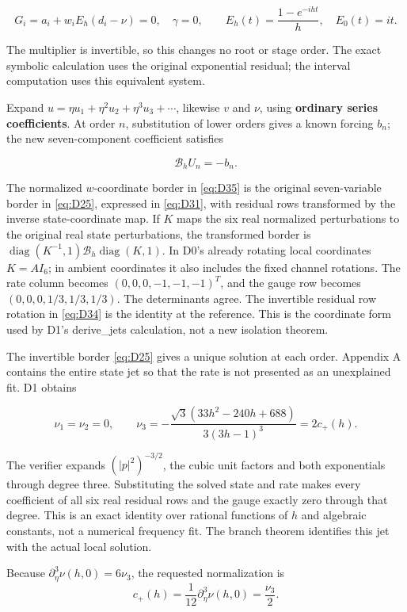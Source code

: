 \documentclass[11pt,a4paper]{article}
\begin{document}
\[
G_i=a_i+w_iE_h(d_i-\nu)=0,\quad \gamma=0,\qquad
E_h(t)=\frac{1-e^{-iht}}h,\quad E_0(t)=it.
\tag{D34}\label{eq:D34}
\]

The multiplier is invertible, so this changes no root or stage order. The exact symbolic calculation uses the original exponential residual; the interval computation uses this equivalent system.

Expand \(u=\eta u_1+\eta^2u_2+\eta^3u_3+\cdots\), likewise \(v\) and \(\nu\), using \textbf{ordinary series coefficients}. At order \(n\), substitution of lower orders gives a known forcing \(b_n\); the new seven-component coefficient satisfies

\[
\mathcal B_h U_n=-b_n.
\tag{D35}\label{eq:D35}
\]

The normalized \(w\)-coordinate border in \eqref{eq:D35} is the original seven-variable border in \eqref{eq:D25}, expressed in \eqref{eq:D31}, with residual rows transformed by the inverse state-coordinate map. If \(K\) maps the six real normalized perturbations to the original real state perturbations, the transformed border is \(\operatorname{diag}(K^{-1},1)\mathcal B_h\operatorname{diag}(K,1)\). In D0's already rotating local coordinates \(K=A I_6\); in ambient coordinates it also includes the fixed channel rotations. The rate column becomes \((0,0,0,-1,-1,-1)^T\), and the gauge row becomes \((0,0,0,1/3,1/3,1/3)\). The determinants agree. The invertible residual row rotation in \eqref{eq:D34} is the identity at the reference. This is the coordinate form used by D1's derive\_\allowbreak{}jets calculation, not a new isolation theorem.

The invertible border \eqref{eq:D25} gives a unique solution at each order. Appendix A contains the entire state jet so that the rate is not presented as an unexplained fit. D1 obtains

\[
\nu_1=\nu_2=0,\qquad
\nu_3=-\frac{\sqrt3(33h^2-240h+688)}{3(3h-1)^3}=2c_+(h).
\tag{D36}\label{eq:D36}
\]

The verifier expands \((|p|^2)^{-3/2}\), the cubic unit factors and both exponentials through degree three. Substituting the solved state and rate makes every coefficient of all six real residual rows and the gauge exactly zero through that degree. This is an exact identity over rational functions of \(h\) and algebraic constants, not a numerical frequency fit. The branch theorem identifies this jet with the actual local solution.

Because \(\partial_\eta^3\nu(h,0)=6\nu_3\), the requested normalization is
\[
c_+(h)=\frac1{12}\partial_\eta^3\nu(h,0)=\frac{\nu_3}{2}.
\tag{D37}\label{eq:D37}
\]
\end{document}
